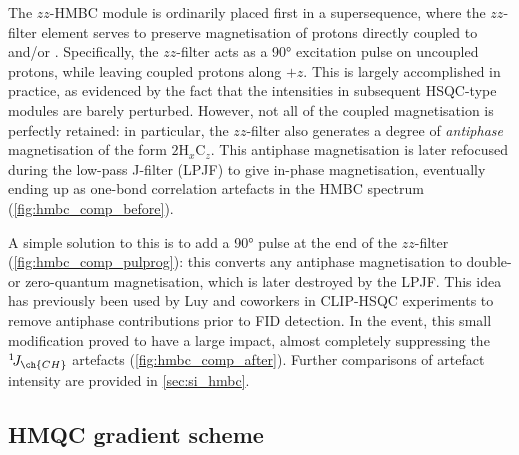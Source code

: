 \documentclass[a4paper,11pt]{article}
\newcommand{\carbon}{\ch{^{13}C}}
\newcommand{\nitrogen}{\ch{^{15}N}}
\newcommand{\onejch}{{}^1\!J_{\ch{CH}}}
\begin{document}
\begin{refsection}
The \(zz\)-HMBC module is ordinarily placed first in a supersequence, where the \(zz\)-filter element serves to preserve magnetisation of protons directly coupled to \carbon{} and/or \nitrogen{}.\autocite{Kupce2018CC,Kupce2019JMR}
Specifically, the \(zz\)-filter acts as a \ang{90} excitation pulse on uncoupled protons, while leaving coupled protons along \(+z\).
This is largely accomplished in practice, as evidenced by the fact that the intensities in subsequent HSQC-type modules are barely perturbed.
However, not all of the coupled magnetisation is perfectly retained: in particular, the \(zz\)-filter also generates a degree of \textit{antiphase} magnetisation of the form \(2\mathrm{H}_x\mathrm{C}_z\).
This antiphase magnetisation is later refocused during the low-pass J-filter (LPJF) to give in-phase magnetisation, eventually ending up as one-bond correlation artefacts in the HMBC spectrum (\cref{fig:hmbc_comp_before}).

A simple solution to this is to add a \carbon{} \ang{90} pulse at the end of the \(zz\)-filter (\cref{fig:hmbc_comp_pulprog}): this converts any antiphase magnetisation to double- or zero-quantum magnetisation, which is later destroyed by the LPJF.
This idea has previously been used by Luy and coworkers in CLIP-HSQC experiments to remove antiphase contributions prior to FID detection.\autocite{Enthart2008JMR}
In the event, this small modification proved to have a large impact, almost completely suppressing the \(\onejch\) artefacts (\cref{fig:hmbc_comp_after}).
Further comparisons of artefact intensity are provided in \cref{sec:si_hmbc}.

\subsection{\texorpdfstring{\nitrogen{}}{15N} HMQC gradient scheme}


\end{refsection}
\end{document}
